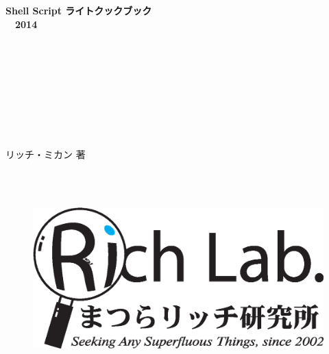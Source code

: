 

\thispagestyle{empty}
\begin{center}

　\\
　\\
　\\
　\\
　\\
　\\
　\\
　\\
　\\

\noindent
\Huge{\textbf{Shell Script ライトクックブック}} \\
\Huge{\textbf{　2014}}
　\\
　\\
\noindent
\textbf{\LARGE{　}}

　\\
　\\
　\\
　\\
　\\
　\\

\noindent
\Large{リッチ・ミカン 著}

　\\
　\\

\begin{figure}[!h]
	\begin{center}
		\vspace{-1cm}
		\includegraphics*[scale=0.25]{tex/0_introduction/figs/MRL_logo_2007_outlined.eps}
		\vspace{-5cm}
	\end{center}
\end{figure}


\end{center}
\clearpage

